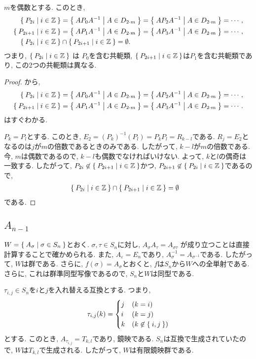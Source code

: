 \begin{prop}
  \label{lem:i2m:conjclass:even}
  $m$を偶数とする.
  このとき,
  \begin{align*}
    \Set{P_{2i}|i\in\mathbb{Z}}&=\Set{AP_0A^{-1} | A \in D_{2\cdot m}}=\Set{AP_2A^{-1} | A \in D_{2\cdot m}}=\cdots,\\
    \Set{P_{2i+1}|i\in\mathbb{Z}}&=\Set{AP_1A^{-1} | A \in D_{2\cdot m}}=\Set{AP_3A^{-1} | A \in D_{2\cdot m}}=\cdots,\\
    \Set{P_{2i}|i\in\mathbb{Z}}&\cap \Set{P_{2i+1}|i\in\mathbb{Z}} =\emptyset.
  \end{align*}
つまり, 
$\Set{P_{2i}|i\in\mathbb{Z}}$ は $P_0$を含む共軛類,
$\Set{P_{2i+1}|i\in\mathbb{Z}}$は$P_1$を含む共軛類であり,
この2つの共軛類は異なる.
\end{prop}
\begin{proof}
  から,
  \begin{align*}
    \Set{P_{2i}|i\in\mathbb{Z}}&=\Set{AP_0A^{-1} | A \in D_{2\cdot m}}=\Set{AP_2A^{-1} | A \in D_{2\cdot m}}=\cdots,\\
    \Set{P_{2i+1}|i\in\mathbb{Z}}&=\Set{AP_1A^{-1} | A \in D_{2\cdot m}}=\Set{AP_3A^{-1} | A \in D_{2\cdot m}}=\cdots.
  \end{align*}
  はすぐわかる.

  $P_{k}=P_{l}$とする.
  このとき, $E_{2}=(P_{k})^{-1}(P_{l})=P_{k}P_{l}=R_{k-l}$である.
  $R_{j}=E_2$となるのは$j$が$m$の倍数であるときのみである.
  したがって, $k-l$が$m$の倍数である.
  今, $m$は偶数であるので, $k-l$も偶数でなければいけない.
  よって, $k$と$l$の偶奇は一致する.
  したがって, $P_{2i}\not\in\Set{P_{2i+1}|i\in\mathbb{Z}}$かつ,
  $P_{2i+1}\not\in\Set{P_{2i}|i\in\mathbb{Z}}$であるので,
\begin{align*}
    \Set{P_{2i}|i\in\mathbb{Z}}&\cap \Set{P_{2i+1}|i\in\mathbb{Z}} =\emptyset
  \end{align*}
  である.
\end{proof}

\subsection{$A_{n-1}$}
\label{ex:an:grp}
$W=\Set{A_\sigma|\sigma\in S_n}$とおく.
$\sigma,\tau \in S_n$に対し,
$A_\sigma A_\tau=A_{\sigma\tau}$
が成り立つことは直接計算することで確かめられる.
また,
$A_{\varepsilon}=E_n$であり,
$A_\sigma^{-1}=A_{\sigma^{-1}}$である.
したがって, $W$は群である.
さらに,
$f(\sigma)=A_\sigma$とおくと,
$f$は$S_n$から$W$への全単射である.
さらに, これは群準同型写像であるので,
$S_n$と$W$は同型である.


$\tau_{i,j}\in S_n$を$i$と$j$を入れ替える互換とする.
つまり,
\begin{align*}
  \tau_{i,j}(k)=
  \begin{cases}
    j&(k=i)\\
    i&(k=j)\\
    k&(k\not\in\Set{i,j})
  \end{cases}
\end{align*}
とする.
このとき, $A_{\tau_{i,j}}=T_{k,l}$であり, 鏡映である.
$S_n$は互換で生成されていたので, $W$は$T_{k,l}$で生成される.
したがって, $W$は有限鏡映群である.


